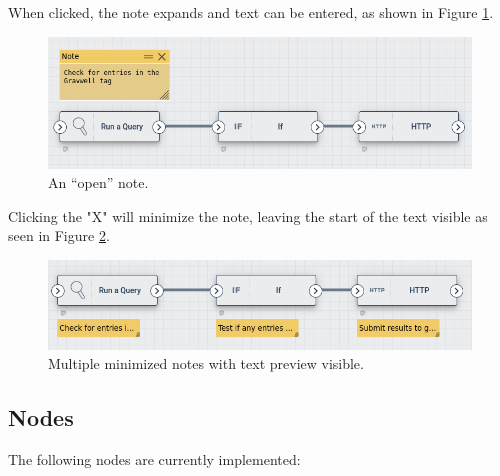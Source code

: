 When clicked, the note expands and text can be entered, as shown in Figure \ref{fig:note-open}.

\begin{figure}
	\includegraphics[width=0.6\linewidth]{images/note-open.png}
	\caption{An ``open'' note.}
	\label{fig:note-open}
\end{figure}

Clicking the "X" will minimize the note, leaving the start of the text visible as seen in Figure \ref{fig:note-multiple}.

\begin{figure}
	\includegraphics[width=0.6\linewidth]{images/note-multiple.png}
	\caption{Multiple minimized notes with text preview visible.}
	\label{fig:note-multiple}
\end{figure}

\subsection{Nodes}

The following nodes are currently implemented:

